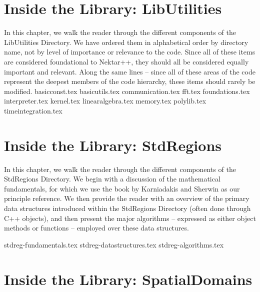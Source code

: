 
\chapter{Inside the Library: LibUtilities}

In this chapter, we walk the reader through the different components of the LibUtilities Directory.
We have ordered them in alphabetical order by directory name, not by level of importance or
relevance to the code.  Since all of these items are considered foundational to Nektar++, they
should all be considered equally important and relevant.   Along the same lines -- since all of
these areas of the code represent the deepest members of the code hierarchy, these
items should rarely be modified. 
%
{basicconst.tex}
%
{basicutils.tex}
%
{communication.tex}
%
{fft.tex}
%
{foundations.tex}
%
{interpreter.tex}
%
{kernel.tex}
%
{linearalgebra.tex}
%
{memory.tex}
%
{polylib.tex}
%
{timeintegration.tex}

\chapter{Inside the Library: StdRegions}
\label{chap:stdregions}

In this chapter, we walk the reader through the different components of the StdRegions Directory.
We begin with a discussion of the mathematical fundamentals, for which we use the book
by Karniadakis and Sherwin \cite{KaSh05} as our principle reference.  We then provide
the reader with an overview of the primary data structures introduced within the
StdRegions Directory (often done through C++ objects), and then present the major 
algorithms -- expressed as either object methods or functions -- employed over these data structures.  

{stdreg-fundamentals.tex}
%
{stdreg-datastructures.tex}
%
{stdreg-algorithms.tex}


\chapter{Inside the Library: SpatialDomains}
\label{chap:spatialdomains}


